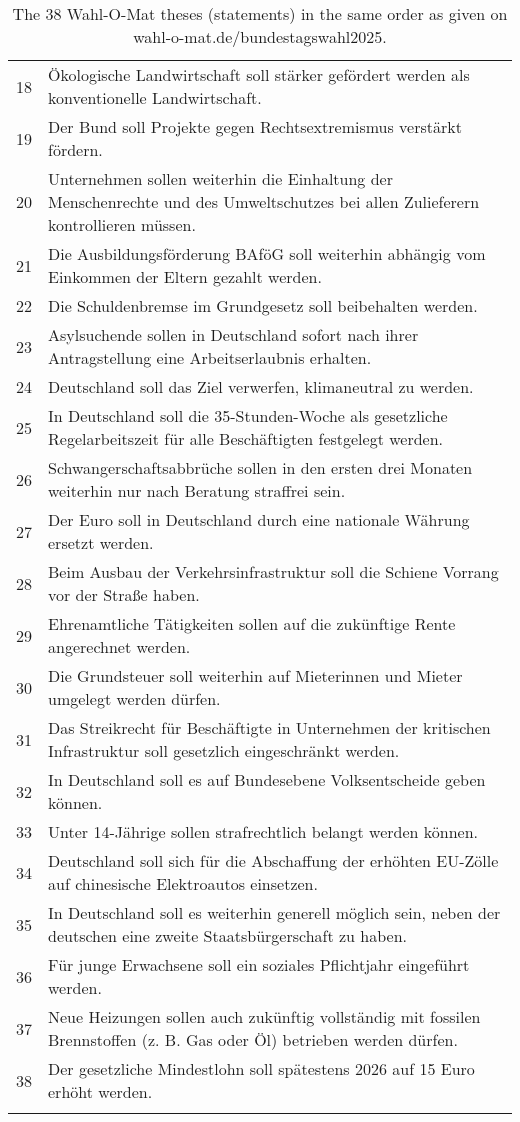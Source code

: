 \documentclass[
	fontsize=10pt,          %
	numbers=noenddot,    	%
    parskip=half,        	%
    listof=totoc,        	%
    bibliography=totoc,  	%
	headsepline=true,       %
	footsepline=false, 		%
    DIV=12                	%
]{scrartcl}
\begin{document}
\begin{longtable}{p{1cm}p{14cm}}
    18 & \"Okologische Landwirtschaft soll st\"arker gef\"ordert werden als konventionelle Landwirtschaft. \\
    19 & Der Bund soll Projekte gegen Rechtsextremismus verst\"arkt f\"ordern. \\
    20 & Unternehmen sollen weiterhin die Einhaltung der Menschenrechte und des Umweltschutzes bei allen Zulieferern kontrollieren m\"ussen. \\
    21 & Die Ausbildungsf\"orderung BAf\"oG soll weiterhin abh\"angig vom Einkommen der Eltern gezahlt werden. \\
    22 & Die Schuldenbremse im Grundgesetz soll beibehalten werden. \\
    23 & Asylsuchende sollen in Deutschland sofort nach ihrer Antragstellung eine Arbeitserlaubnis erhalten. \\
    24 & Deutschland soll das Ziel verwerfen, klimaneutral zu werden. \\
    25 & In Deutschland soll die 35-Stunden-Woche als gesetzliche Regelarbeitszeit f\"ur alle Besch\"aftigten festgelegt werden. \\
    26 & Schwangerschaftsabbr\"uche sollen in den ersten drei Monaten weiterhin nur nach Beratung straffrei sein. \\
    27 & Der Euro soll in Deutschland durch eine nationale W\"ahrung ersetzt werden. \\
    28 & Beim Ausbau der Verkehrsinfrastruktur soll die Schiene Vorrang vor der Stra\ss e haben. \\
    29 & Ehrenamtliche T\"atigkeiten sollen auf die zuk\"unftige Rente angerechnet werden. \\
    30 & Die Grundsteuer soll weiterhin auf Mieterinnen und Mieter umgelegt werden d\"urfen. \\
    31 & Das Streikrecht f\"ur Besch\"aftigte in Unternehmen der kritischen Infrastruktur soll gesetzlich eingeschr\"ankt werden. \\
    32 & In Deutschland soll es auf Bundesebene Volksentscheide geben k\"onnen. \\
    33 & Unter 14-J\"ahrige sollen strafrechtlich belangt werden k\"onnen. \\
    34 & Deutschland soll sich f\"ur die Abschaffung der erh\"ohten EU-Z\"olle auf chinesische Elektroautos einsetzen. \\
    35 & In Deutschland soll es weiterhin generell m\"oglich sein, neben der deutschen eine zweite Staatsb\"urgerschaft zu haben. \\
    36 & F\"ur junge Erwachsene soll ein soziales Pflichtjahr eingef\"uhrt werden. \\
    37 & Neue Heizungen sollen auch zuk\"unftig vollst\"andig mit fossilen Brennstoffen (z. B. Gas oder \"Ol) betrieben werden d\"urfen. \\
    38 & Der gesetzliche Mindestlohn soll sp\"atestens 2026 auf 15 Euro erh\"oht werden. \\
    \bottomrule
\caption{The 38 Wahl-O-Mat theses (statements) in the same order as given on wahl-o-mat.de/bundestagswahl2025.}
\end{longtable}
\end{document}
